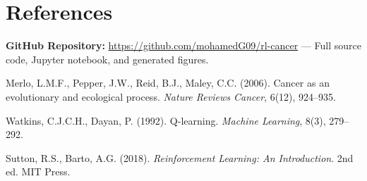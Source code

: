 \documentclass[12pt,a4paper]{article}
\begin{document}
\section{References}

\begin{enumerate}[label={[\arabic*]}]
    \item \textbf{GitHub Repository:} \url{https://github.com/mohamedG09/rl-cancer} --- Full source code, Jupyter notebook, and generated figures.
    \item Merlo, L.M.F., Pepper, J.W., Reid, B.J., Maley, C.C. (2006). Cancer as an evolutionary and ecological process. \textit{Nature Reviews Cancer}, 6(12), 924--935.
    \item Watkins, C.J.C.H., Dayan, P. (1992). Q-learning. \textit{Machine Learning}, 8(3), 279--292.
    \item Sutton, R.S., Barto, A.G. (2018). \textit{Reinforcement Learning: An Introduction}. 2nd ed. MIT Press.
\end{enumerate}
\end{document}
